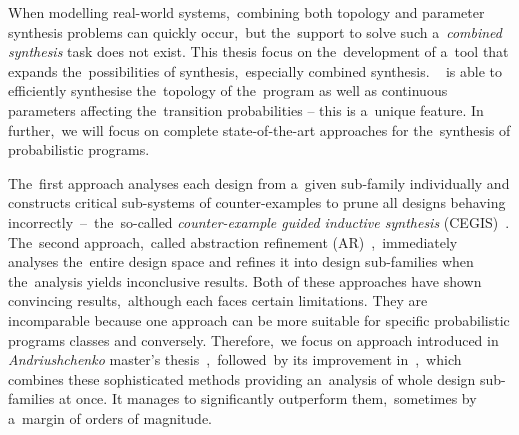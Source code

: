 When modelling real-world systems,~combining both topology and parameter synthesis problems can quickly occur,~but the~support to solve such a~\textit{combined synthesis} task does not exist.
This thesis focus on the~development of a~tool \toolname{} that expands the~possibilities of synthesis,~especially combined synthesis.
~\toolname{} is able to efficiently synthesise the~topology of the~program as well as continuous parameters affecting the~transition probabilities -- this is a~unique feature.
In further,~we will focus on complete state-of-the-art approaches for the~synthesis of probabilistic programs.

The~first approach analyses each design from a~given sub-family individually and constructs critical sub-systems of counter-examples to prune all designs behaving incorrectly \,--\, the~so-called \textit{counter-example guided inductive synthesis} (CEGIS)~\cite{cegis}.
The~second approach,~called abstraction refinement (AR)~\cite{cegar},~immediately analyses the~entire design space and refines it into design sub-families when the~analysis yields inconclusive results.
Both of these approaches have shown convincing results,~although each faces certain limitations.
They are incomparable because one approach can be more suitable for specific probabilistic programs classes and conversely.
Therefore,~we focus on approach introduced in \textit{Andriushchenko} master’s thesis~\cite{roman-DP},~followed~by its improvement in~\cite{tacas21},~which combines these sophisticated methods providing an~analysis of whole design sub-families at once.
It manages to significantly outperform them,~sometimes by a~margin of orders of magnitude.

